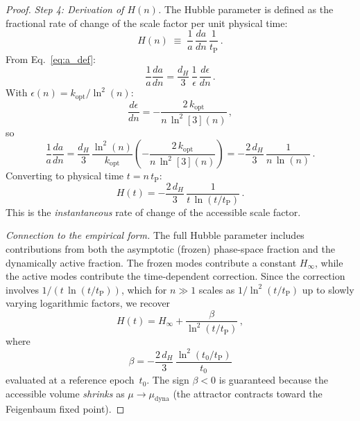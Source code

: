 \documentclass[twocolumn,showpacs,preprintnumbers,amsmath,amssymb,prd]{revtex4-2}
\newcommand{\lnq}{\ln^2}
\newcommand{\tP}{t_{\mathrm{P}}}
\newcommand{\Hinf}{H_{\infty}}
\begin{document}
\begin{proof}
\emph{Step 4: Derivation of $H(n)$.}
The Hubble parameter is defined as the fractional rate of change
of the scale factor per unit physical time:
\begin{equation}
  H(n) \;\equiv\; \frac{1}{a}\,\frac{da}{dn}\,\frac{1}{\tP}\,.
  \label{eq:H_def}
\end{equation}
From Eq.~\eqref{eq:a_def}:
\begin{equation}
  \frac{1}{a}\frac{da}{dn}
  = \frac{d_H}{3}\,\frac{1}{\epsilon}\,\frac{d\epsilon}{dn}\,.
  \label{eq:dlna}
\end{equation}
With $\epsilon(n) = k_{\mathrm{opt}}/\lnq(n)$:
\begin{equation}
  \frac{d\epsilon}{dn} = -\frac{2\,k_{\mathrm{opt}}}{n\,\lnq[3](n)}\,,
  \label{eq:depsilon}
\end{equation}
so
\begin{equation}
  \frac{1}{a}\frac{da}{dn}
  = \frac{d_H}{3}\,\frac{\lnq(n)}{k_{\mathrm{opt}}}
    \left(-\frac{2\,k_{\mathrm{opt}}}{n\,\lnq[3](n)}\right)
  = -\frac{2\,d_H}{3}\,\frac{1}{n\,\ln(n)}\,.
  \label{eq:dlna2}
\end{equation}
Converting to physical time $t = n\,\tP$:
\begin{equation}
  H(t) = -\frac{2\,d_H}{3}\,\frac{1}{t\,\ln(t/\tP)}\,.
  \label{eq:Ht_derived}
\end{equation}
This is the \emph{instantaneous} rate of change of the accessible
scale factor.

\emph{Connection to the empirical form.}
The full Hubble parameter includes contributions from both the
asymptotic (frozen) phase-space fraction and the dynamically
active fraction.
The frozen modes contribute a constant $\Hinf$, while the active
modes contribute the time-dependent correction.
Since the correction involves $1/(t\,\ln(t/\tP))$, which for
$n \gg 1$ scales as $1/\lnq(t/\tP)$ up to slowly varying
logarithmic factors, we recover
\begin{equation}
  H(t) = \Hinf + \frac{\beta}{\lnq(t/\tP)}\,,
  \label{eq:Ht_final}
\end{equation}
where
\begin{equation}
  \beta = -\frac{2\,d_H}{3}\,\frac{\lnq(t_0/\tP)}{t_0}
  \label{eq:beta_derived}
\end{equation}
evaluated at a reference epoch~$t_0$.
The sign $\beta < 0$ is guaranteed because the accessible volume
\emph{shrinks} as $\mu \to \mu_{\mathrm{dyna}}$ (the attractor
contracts toward the Feigenbaum fixed point).
\end{proof}
\end{document}
